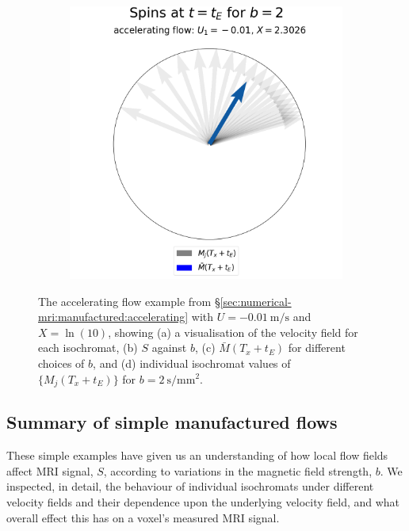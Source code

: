 \begin{figure}
\begin{subfigure}{0.4\textwidth}
                    \caption{}
                    \label{fig:mri-accelerating:b}
                \end{subfigure}
                \begin{subfigure}{0.4\textwidth}
                    \centering
                    \includegraphics[width=\textwidth]{diagrams/results-mri/simple-tests/mri-spins_avg_2D_accelerating_test_5.png}
                    \caption{}
                    \label{fig:mri-accelerating:spins}
                \end{subfigure}
                \caption{The accelerating flow example from \S\ref{sec:numerical-mri:manufactured:accelerating} with $U = \qty{-0.01}{\metre\per\second}$ and $X = \ln(10)$, showing (a) a visualisation of the velocity field for each isochromat, (b) $S$ against $b$, (c) $\bar{M}(T_x + t_E)$ for different choices of $b$, and (d) individual isochromat values of $\{ M_j(T_x + t_E) \}$ for $b=\qty{2}{\second\per\milli\metre^2}$.}
                \label{fig:mri-accelerating}
            \end{figure}

        \subsection{Summary of simple manufactured flows}
            These simple examples have given us an understanding of how local flow fields affect MRI signal, $S$, according to variations in the magnetic field strength, $b$. We inspected, in detail, the behaviour of individual isochromats under different velocity fields and their dependence upon the underlying velocity field, and what overall effect this has on a voxel's measured MRI signal.
            
